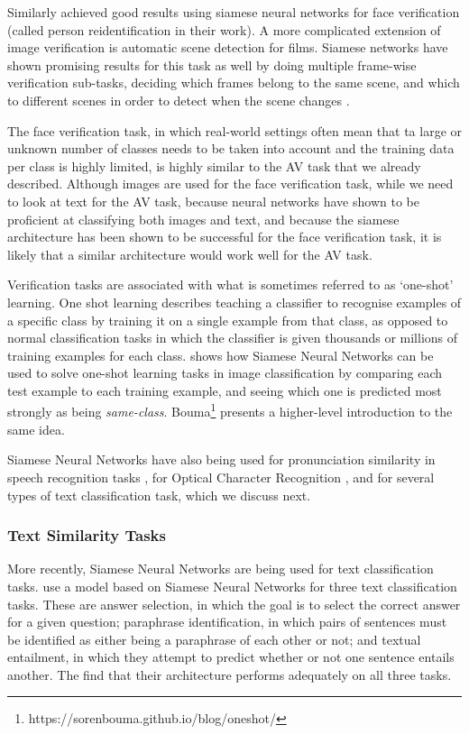 Similarly \citet{zhu2017deep} achieved good results using siamese neural networks for face verification (called person reidentification in their work). A more complicated extension of image verification is automatic scene detection for films. Siamese networks have shown promising results for this task as well by doing multiple frame-wise verification sub-tasks, deciding which frames belong to the same scene, and which to different scenes in order to detect when the scene changes \cite{baraldi2015deep}.

The face verification task, in which real-world settings often mean that ta large or unknown number of classes needs to be taken into account and the training data per class is highly limited, is highly similar to the AV task that we already described. Although images are used for the face verification task, while we need to look at text for the AV task, because neural networks have shown to be proficient at classifying both images and text, and because the siamese architecture has been shown to be successful for the face verification task, it is likely that a similar architecture would work well for the AV task.

Verification tasks are associated with what is sometimes referred to as `one-shot' learning. One shot learning describes teaching a classifier to recognise examples of a specific class by training it on a single example from that class, as opposed to normal classification tasks in which the classifier is given thousands or millions of training examples for each class. \citet{koch2015siamese} shows how Siamese Neural Networks can be used to solve one-shot learning tasks in image classification by comparing each test example to each training example, and seeing which one is predicted most strongly as being \textit{same-class}. Bouma\footnote{https://sorenbouma.github.io/blog/oneshot/} presents a higher-level introduction to the same idea.

Siamese Neural Networks have also being used for pronunciation similarity in speech recognition tasks \cite{naaman2017learning}, for Optical Character Recognition \cite{hosseini2015similarity}, and for several types of text classification task, which we discuss next.

\subsubsection{Text Similarity Tasks}
\label{siamese-networks-for-nlp}
More recently, Siamese Neural Networks are being used for text classification tasks. \citet{yin2016abcnn} use a model based on Siamese Neural Networks for three text classification tasks. These are answer selection, in which the goal is to select the correct answer for a given question; paraphrase identification, in which pairs of sentences must be identified as either being a paraphrase of each other or not; and textual entailment, in which they attempt to predict whether or not one sentence entails another. The find that their architecture performs adequately on all three tasks.

